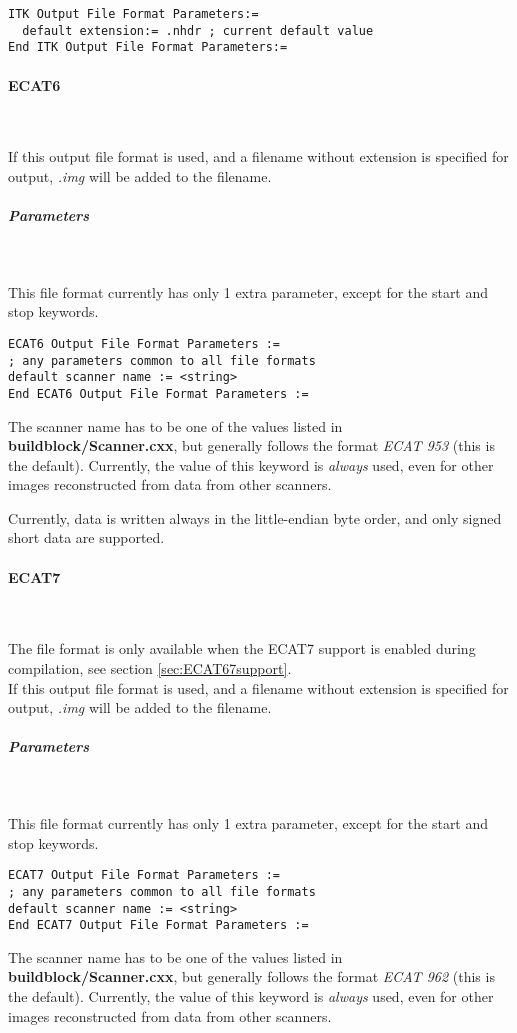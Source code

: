 \documentclass{article}
\newcommand{\subsubsubsection}[1]{\paragraph{#1}\mbox{} \\}
\newcommand{\subsubsubsubsection}[1]{\subparagraph{#1} \mbox{} \\}
\begin{document}
{{\begin{verbatim}
ITK Output File Format Parameters:=
  default extension:= .nhdr ; current default value
End ITK Output File Format Parameters:=
\end{verbatim}

{ \subsubsubsection{ECAT6}
}
If this output file format is used, and a filename without extension 
is specified for output, \textit{.img} will be added to the filename.

{ \subsubsubsubsection{Parameters}
}
This file format currently has only 1 extra parameter, except 
for the start and stop keywords.

\begin{verbatim}
ECAT6 Output File Format Parameters :=
; any parameters common to all file formats
default scanner name := <string>
End ECAT6 Output File Format Parameters :=
\end{verbatim}

The scanner name has to be one of the values listed in \textbf{buildblock/Scanner.cxx}, 
but generally follows the format \textit{ECAT 953} (this is the default). 
Currently, the value of this keyword is \textit{always} used, even 
for other images reconstructed from data from other scanners.

Currently, data is written always in the little-endian byte order, 
and only signed short data are supported.

{ \subsubsubsection{ECAT7}
}
The file format is only available when the ECAT7 support is enabled 
during compilation, see section \ref{sec:ECAT67support}.\\
If this output file format is used, and a filename without extension 
is specified for output, \textit{.img} will be added to the filename.

{ \subsubsubsubsection{Parameters}
}
This file format currently has only 1 extra parameter, except 
for the start and stop keywords.

\begin{verbatim}
ECAT7 Output File Format Parameters :=
; any parameters common to all file formats
default scanner name := <string>
End ECAT7 Output File Format Parameters :=
\end{verbatim}

The scanner name has to be one of the values listed in \textbf{buildblock/Scanner.cxx}, 
but generally follows the format \textit{ECAT 962} (this is the default). 
Currently, the value of this keyword is \textit{always} used, even 
for other images reconstructed from data from other scanners.


}}
\end{document}
